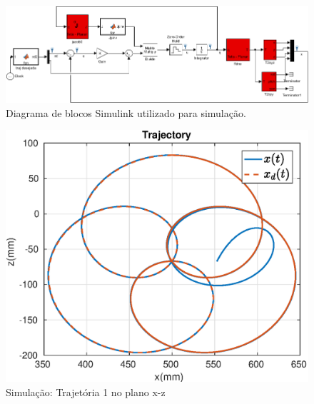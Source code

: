 \begin{figure}[H]
\centering
  \includegraphics[width=\linewidth]{./img/simulink.png}
  \caption{Diagrama de blocos Simulink utilizado para simulação.}
  \label{fig:simulink}
\end{figure}%

\begin{figure}[H]
\centering
  \includegraphics[width=0.5\linewidth]{./img/simul_delay_zoh1/traj.eps}
  \caption{Simulação: Trajetória 1 no plano x-z}
  \label{fig:simul_traj1}
\end{figure}%


